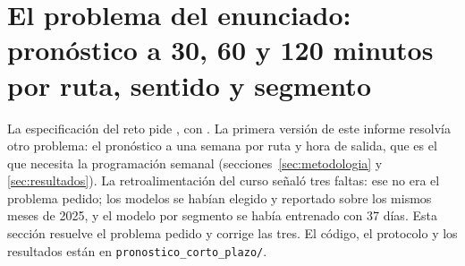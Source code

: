 \renewcommand{\thesection}{P}\renewcommand{\theHsection}{P}
\section{El problema del enunciado: pronóstico a 30, 60 y 120 minutos por ruta, sentido y segmento}
\label{sec:corto-plazo}
\renewcommand{\thesection}{\arabic{section}}\renewcommand{\theHsection}{\arabic{section}}
\addtocounter{section}{-1}
\setcounter{cptabla}{\value{table}}\setcounter{cpfigura}{\value{figure}}
\setcounter{table}{0}\setcounter{figure}{0}
\renewcommand{\thetable}{P.\arabic{table}}\renewcommand{\theHtable}{P.\arabic{table}}
\renewcommand{\thefigure}{P.\arabic{figure}}\renewcommand{\theHfigure}{P.\arabic{figure}}

La especificación del reto pide 
, con . La primera versión de este informe resolvía otro problema: el pronóstico a una semana por ruta y
hora de salida, que es el que necesita la programación semanal (secciones~\ref{sec:metodologia} y
\ref{sec:resultados}). La retroalimentación del curso señaló tres faltas: ese no era el problema pedido; los modelos
se habían elegido y reportado sobre los mismos meses de 2025, y el modelo por segmento se había entrenado con 37 días.
Esta sección resuelve el problema pedido y corrige las tres. El código, el protocolo y los resultados están en
\texttt{pronostico\_corto\_plazo/}.

